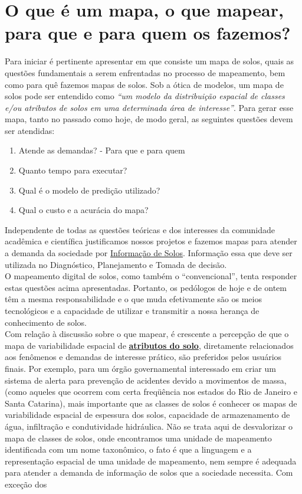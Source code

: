\section{O que é um mapa, o que mapear, para que e para quem os fazemos?}
Para iniciar é pertinente apresentar em que consiste um mapa de solos, quais as questões fundamentais a serem enfrentadas no processo de mapeamento, bem como para quê fazemos mapas de solos. Sob a ótica de modelos, um mapa de solos pode ser entendido como \emph{``um modelo da distribuição espacial de classes e/ou atributos de solos em uma determinada área de interesse''}. Para gerar esse mapa, tanto no passado como hoje, de modo geral, as seguintes questões devem ser atendidas:
\begin{enumerate}
\item Atende as demandas? - Para que e para quem
\item Quanto tempo para executar?
\item Qual é o modelo de predição utilizado?
\item Qual o custo e a acurácia do mapa?
\end{enumerate}
Independente de todas as questões teóricas e dos interesses da comunidade acadêmica e científica justificamos nossos projetos e fazemos mapas para atender a demanda da sociedade por \underline{Informação de Solos}. Informação essa que deve ser utilizada no Diagnóstico, Planejamento e Tomada de decisão.\\
O mapeamento digital de solos, como também o ``convencional'', tenta responder estas questões acima apresentadas. Portanto, os pedólogos de hoje e de ontem têm a mesma responsabilidade e o que muda efetivamente são os meios tecnológicos e a capacidade de utilizar e transmitir a nossa herança de conhecimento de solos.\\
Com relação à discussão sobre o que mapear, é crescente a percepção de que o mapa de variabilidade espacial de \underline{\textbf{atributos do solo}}, diretamente relacionados aos fenômenos e demandas de interesse prático, são preferidos pelos usuários finais. Por exemplo, para um órgão governamental interessado em criar um sistema de alerta para prevenção de acidentes devido a movimentos de massa, (como aqueles que ocorrem com certa freqüência nos estados do Rio de Janeiro e Santa Catarina), mais importante que as classes de solos é conhecer os mapas de variabilidade espacial de espessura dos solos, capacidade de armazenamento de água, infiltração e condutividade hidráulica. Não se trata aqui de desvalorizar o mapa de classes de solos, onde encontramos uma unidade de mapeamento identificada com um nome taxonômico, o fato é que a linguagem e a representação espacial de uma unidade de mapeamento, nem sempre é adequada para atender a demanda de informação de solos que a sociedade necessita. Com exceção dos 
